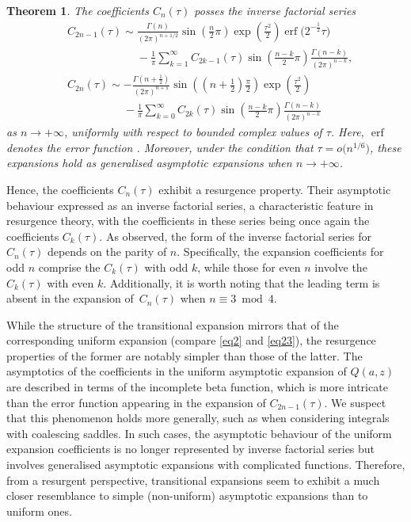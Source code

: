 \documentclass[11pt]{article}
\numberwithin{equation}{section}
\def\erf{\operatorname{erf}}
\numberwithin{equation}{section}
\newtheorem{Theorem}{Theorem}[section]
\begin{document}
\begin{Theorem}\label{thm1} The coefficients $C_n(\tau)$ posses the inverse factorial series
\begin{align}
& C_{2n - 1} (\tau ) \sim \frac{\Gamma (n)}{(2\pi )^{n + 1/2}}\sin \left( \frac{n }{2}\pi \right)\exp \left( \frac{\tau ^2 }{2} \right)\erf\big( 2^{ - \frac{1}{2}} \tau \big) \nonumber\\
&\phantom{C_{2n - 1} (\tau ) \sim}{}- \frac{1}{\pi }\sum_{k = 1}^\infty C_{2k - 1} (\tau )\sin \left( \frac{n - k}{2}\pi \right)\frac{\Gamma (n - k)}{(2\pi )^{n - k} } ,\label{eq14}
\\ &
C_{2n} (\tau ) \sim - \frac{\Gamma \left( n + \frac{1}{2} \right)}{(2\pi )^{n + 1} }\sin \left( \left( n + \frac{1}{2} \right)\frac{\pi }{2} \right)\exp \left( \frac{\tau ^2}{2} \right) \nonumber\\
&\phantom{C_{2n} (\tau ) \sim}{}- \frac{1}{\pi }\sum\limits_{k = 0}^\infty C_{2k} (\tau )\sin \left( \frac{n - k}{2}\pi \right)\frac{\Gamma (n - k)}{(2\pi )^{n - k} }\label{eq15}
\end{align}
as $n\to +\infty$, uniformly with respect to bounded complex values of $\tau$. Here, $\erf$ denotes the error function {\rm\cite[equation~(7.2.1)]{DLMF}}. Moreover, under the condition that $\tau = o\big(n^{1/6}\big)$, these expansions hold as generalised asymptotic expansions {\rm\cite[Section~2.1\,(v)]{DLMF}} when $n\to +\infty$.
\end{Theorem}

Hence, the coefficients $C_n(\tau)$ exhibit a resurgence property. Their asymptotic behaviour expressed as an inverse factorial series, a characteristic feature in resurgence theory, with the coefficients in these series being once again the coefficients $C_k(\tau)$. As observed, the form of the inverse factorial series for $C_n(\tau)$ depends on the parity of $n$. Specifically, the expansion coefficients for odd $n$ comprise the $C_k(\tau)$ with odd $k$, while those for even $n$ involve the $C_k(\tau)$ with even $k$. Additionally, it is worth noting that the leading term is absent in the expansion of~$C_n(\tau)$ when $n \equiv 3 \bmod{4}$.

While the structure of the transitional expansion mirrors that of the corresponding uniform expansion (compare \eqref{eq2} and \eqref{eq23}), the resurgence properties of the former are notably simpler than those of the latter. The asymptotics of the coefficients in the uniform asymptotic expansion of $Q(a,z)$ are described in terms of the incomplete beta function, which is more intricate than the error function appearing in the expansion of $C_{2n - 1}(\tau)$. We suspect that this phenomenon holds more generally, such as when considering integrals with coalescing saddles. In such cases, the asymptotic behaviour of the uniform expansion coefficients is no longer represented by inverse factorial series but involves generalised asymptotic expansions with complicated functions. Therefore, from a resurgent perspective, transitional expansions seem to exhibit a much closer resemblance to simple (non-uniform) asymptotic expansions than to uniform ones.
\end{document}
